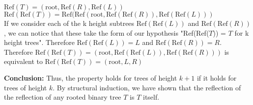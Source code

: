 \documentclass[solution,letterpaper]{cs20}
\begin{document}
\begin{problem}
\begin{solution}
        \(\text{Ref}(T) = (\text{root}, \text{Ref}(R), \text{Ref}(L))\) \\
        \(\text{Ref}(\text{Ref}(T)) = \text{Ref}(\text{Ref}(\text{root}, \text{Ref}(\text{Ref}(R)), \text{Ref}(\text{Ref}(L)))\) \\

        If we consider each of the k height subtrees $\text{Ref}(\text{Ref}(L))$ and $\text{Ref}(\text{Ref}(R))$, we can notice that these take the form of our hypothesis "Ref(Ref($T$)) = $T$ for k height trees". Therefore $\text{Ref}(\text{Ref}(L)) = L$ and $\text{Ref}(\text{Ref}(R)) = R$. \\

        Therefore \(\text{Ref}(\text{Ref}(T)) = (\text{root}, \text{Ref}(\text{Ref}(L)), \text{Ref}(\text{Ref}(R)))\) is equivalent to \(\text{Ref}(\text{Ref}(T)) = (\text{root}, L, R)\)

        \textbf{Conclusion:}
        Thus, the property holds for trees of height \( k+1 \) if it holds for trees of height \( k \). By structural induction, we have shown that the reflection of the reflection of any rooted binary tree \( T \) is \( T \) itself.
        \end{solution}
    \end{problem}
    \newpage
\end{document}
